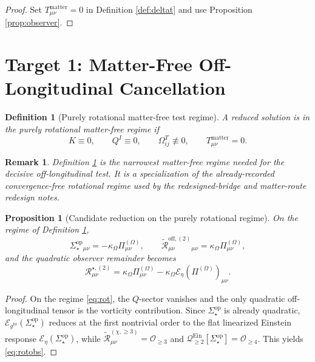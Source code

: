 \documentclass[11pt]{article}
\newcommand{\ReBridge}{g^{\mathrm{br}}}
\newcommand{\PiOmega}{\Pi^{(\Omega)}}
\newcommand{\SigmaOpStar}{\Sigma^{\mathrm{op}}_\star}
\newcommand{\ReOffTwo}{\widetilde{\mathcal R}_{\mu\nu}^{\mathrm{off},(2)}}
\newcommand{\ReLong}{\widetilde{\mathcal R}_{\mu\nu}^{(\chi,\ge 3)}}
\newcommand{\EinLin}{\mathcal E_{\ReBridge}}
\newcommand{\EinLinFlat}{\mathcal E_{\eta}}
\newcommand{\EinQuad}{\mathcal Q_{\ge 2}^{\mathrm{Ein}}}
\newtheorem{definition}{Definition}
\newtheorem{proposition}{Proposition}
\newtheorem{remark}{Remark}
\begin{document}
\begin{proof}
Set \(T_{\mu\nu}^{\mathrm{matter}}=0\) in Definition \ref{def:deltat} and use Proposition \ref{prop:observer}.
\end{proof}

\section{Target 1: Matter-Free Off-Longitudinal Cancellation}

\begin{definition}[Purely rotational matter-free test regime]
\label{def:rot}
A reduced solution is in the \emph{purely rotational matter-free regime} if
\begin{equation}
K\equiv 0,
\qquad
Q^I\equiv 0,
\qquad
\Omega_{ij}^T\not\equiv 0,
\qquad
T_{\mu\nu}^{\mathrm{matter}}=0.
\label{eq:rot}
\end{equation}
\end{definition}

\begin{remark}
Definition \ref{def:rot} is the narrowest matter-free regime needed for the decisive off-longitudinal test. It is a specialization of the already-recorded convergence-free rotational regime used by the redesigned-bridge and matter-route redesign notes.
\end{remark}

\begin{proposition}[Candidate reduction on the purely rotational regime]
\label{prop:rotreduce}
On the regime of Definition \ref{def:rot},
\begin{equation}
\SigmaOpStar{}_{\mu\nu}
=
-\kappa_\Omega\PiOmega_{\mu\nu},
\qquad
\ReOffTwo{}_{\mu\nu}
=
\kappa_\Omega\PiOmega_{\mu\nu},
\label{eq:rotreduce}
\end{equation}
and the quadratic observer remainder becomes
\begin{equation}
\mathcal R_{\mu\nu}^{\star,(2)}
=
\kappa_\Omega\PiOmega_{\mu\nu}
-\kappa_\Omega\EinLinFlat(\PiOmega)_{\mu\nu}.
\label{eq:rotobs}
\end{equation}
\end{proposition}

\begin{proof}
On the regime \eqref{eq:rot}, the \(Q\)-sector vanishes and the only quadratic off-longitudinal tensor is the vorticity contribution. Since \(\SigmaOpStar\) is already quadratic, \(\EinLin(\SigmaOpStar)\) reduces at the first nontrivial order to the flat linearized Einstein response \(\EinLinFlat(\SigmaOpStar)\), while \(\ReLong=\mathcal O_{\ge 3}\) and \(\EinQuad[\SigmaOpStar]=\mathcal O_{\ge 4}\). This yields \eqref{eq:rotobs}.
\end{proof}
\end{document}
